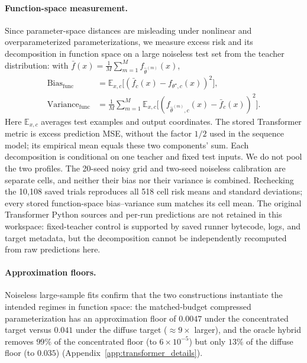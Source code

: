 \paragraph{Function-space measurement.}
Since parameter-space distances are misleading under nonlinear and
overparameterized parameterizations, we measure excess risk and its
decomposition in function space on a large noiseless test set from the
teacher distribution: with $\bar f(x)=\frac{1}{M}\sum_{m=1}^{M}f_{\hat\theta^{(m)}}(x)$,
\begin{align}
 \mathrm{Bias}_{\mathrm{func}}
 &=\mathbb E_{x,c}\big[(\bar f_c(x)-f_{\theta^\star,c}(x))^2\big],\\
 \mathrm{Variance}_{\mathrm{func}}
 &=\frac1M\sum_{m=1}^M\mathbb E_{x,c}
 \big[(f_{\hat\theta^{(m)},c}(x)-\bar f_c(x))^2\big].
 \label{eq:functional_bias_variance}
\end{align}
Here $\mathbb E_{x,c}$ averages test examples and output coordinates. The stored Transformer metric is excess prediction MSE, without the factor $1/2$ used in the sequence model; its empirical mean equals these two components' sum. Each decomposition is conditional on one teacher and fixed test inputs. We do not pool the two profiles. The 20-seed noisy grid and two-seed noiseless calibration are separate cells, and neither their bias nor their variance is combined. Rechecking the 10,108 saved trials reproduces all 518 cell risk means and standard deviations; every stored function-space bias--variance sum matches its cell mean. The original Transformer Python sources and per-run predictions are not retained in this workspace: fixed-teacher control is supported by saved runner bytecode, logs, and target metadata, but the decomposition cannot be independently recomputed from raw predictions here.

\paragraph{Approximation floors.}
Noiseless large-sample fits confirm that the two constructions instantiate
the intended regimes in function space: the matched-budget compressed
parameterization has an approximation floor of $0.0047$ under the
concentrated target versus $0.041$ under the diffuse target ($\approx 9\times$
larger), and the oracle hybrid removes $99\%$ of the concentrated floor
(to $6\times 10^{-5}$) but only $13\%$ of the diffuse floor (to $0.035$)
(Appendix~\ref{app:transformer_details}).

